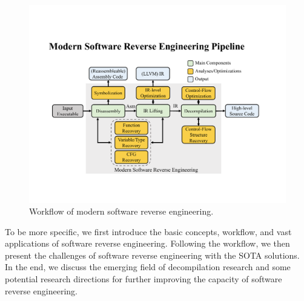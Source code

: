 \begin{figure}[tb]
  \centering
  \includegraphics[width=1.0\textwidth]{fig/pipeline.pdf}
  \caption{Workflow of modern software reverse engineering.}
  \label{fig:workflow}
\end{figure}


To be more specific, we first introduce the basic concepts, workflow, and vast
applications of software reverse engineering. Following the workflow, we then
present the challenges of software reverse engineering with the SOTA solutions.
In the end, we discuss the emerging field of decompilation research and some
potential research directions for further improving the capacity of software
reverse engineering.


\newpage
